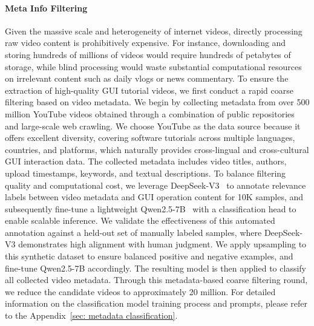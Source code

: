 \documentclass{llmxive}
\begin{document}
\paragraph{Meta Info Filtering}
Given the massive scale and heterogeneity of internet videos, directly processing raw video content is prohibitively expensive. For instance, downloading and storing hundreds of millions of videos would require hundreds of petabytes of storage, while blind processing would waste substantial computational resources on irrelevant content such as daily vlogs or news commentary. 
To ensure the extraction of high-quality GUI tutorial videos, we first conduct a rapid coarse filtering based on video metadata. We begin by collecting metadata from over 500 million YouTube videos obtained through a combination of public repositories and large-scale web crawling. We choose YouTube as the data source because it offers excellent diversity, covering software tutorials across multiple languages, countries, and platforms, which naturally provides cross-lingual and cross-cultural GUI interaction data. The collected metadata includes video titles, authors, upload timestamps, keywords, and textual descriptions.
To balance filtering quality and computational cost, we leverage DeepSeek-V3~\citep{liu2024deepseek} to annotate relevance labels between video metadata and GUI operation content for 10K samples, and subsequently fine-tune a lightweight Qwen2.5-7B~\citep{Yang2024Qwen25TR} with a classification head to enable scalable inference.
We validate the effectiveness of this automated annotation against a held-out set of manually labeled samples, where DeepSeek-V3 demonstrates high alignment with human judgment. 
We apply upsampling to this synthetic dataset to ensure balanced positive and negative examples, and fine-tune Qwen2.5-7B accordingly. 
The resulting model is then applied to classify all collected video metadata. Through this metadata-based coarse filtering round, we reduce the candidate videos to approximately 20 million. For detailed information on the classification model training process and prompts, please refer to the Appendix~\ref{sec: metadata classification}.
\end{document}
